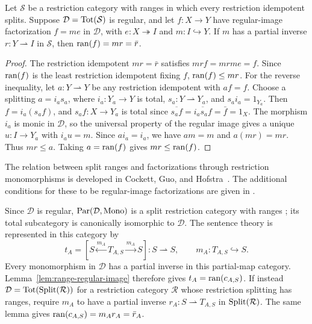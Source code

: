 \begin{lemma}\label{lem:range-regular-image}
Let $\mathcal S$ be a restriction category with ranges in which every
restriction idempotent splits. Suppose $\mathcal D=\operatorname{Tot}(\mathcal S)$
is regular, and let $f:X\to Y$ have regular-image factorization
$f=me$ in $\mathcal D$, with $e:X\twoheadrightarrow I$ and
$m:I\hookrightarrow Y$.
If $m$ has a partial inverse $r:Y\rightharpoonup I$ in $\mathcal S$,
then $\operatorname{ran}(f)=mr=\bar r$.
\end{lemma}
\begin{proof}
The restriction idempotent $mr=\bar r$ satisfies $mrf=mrme=f$.
Since $\operatorname{ran}(f)$ is the least restriction idempotent fixing $f$,
$\operatorname{ran}(f)\leq mr$. For the reverse inequality, let $a:Y\rightharpoonup Y$
be any restriction idempotent with $af=f$. Choose a splitting
$a=i_a s_a$, where $i_a:Y_a\to Y$ is total, $s_a:Y\rightharpoonup Y_a$,
and $s_a i_a=1_{Y_a}$. Then $f=i_a(s_a f)$, and $s_a f:X\to Y_a$ is
total since $\overline{s_a f}=\overline{i_a s_a f}=\bar f=1_X$.
The morphism $i_a$ is monic in $\mathcal D$, so the universal property
of the regular image gives a unique $u:I\to Y_a$ with $i_a u=m$.
Since $a i_a=i_a$, we have $am=m$ and $a(mr)=mr$. Thus $mr\leq a$.
Taking $a=\operatorname{ran}(f)$ gives $mr\leq\operatorname{ran}(f)$.
\end{proof}

The relation between split ranges and factorizations through restriction
monomorphisms is developed in Cockett, Guo, and
Hofstra~\cite[Theorem 4.7]{CGHRangeI}.
The additional conditions for these to be regular-image factorizations
are given in \cite[Section 3.16 and Proposition 3.17]{CGHRangeII}.

Since $\mathcal D$ is regular, $\operatorname{Par}(\mathcal D,\operatorname{Mono})$ is a
split restriction category with ranges
\cite[Theorem 4.5 and Section 4.11]{CGHRangeI}; its total subcategory
is canonically isomorphic to $\mathcal D$.
The sentence theory is represented in this category by
\[
 t_A=[S\xleftarrow{m_A}T_{A,S}\xrightarrow{m_A}S]:S\rightharpoonup S,
 \qquad m_A:T_{A,S}\hookrightarrow S.
\]
Every monomorphism in $\mathcal D$ has a partial inverse in this
partial-map category. Lemma~\ref{lem:range-regular-image} therefore
gives $t_A=\operatorname{ran}(c_{A,S})$.
If instead $\mathcal D=\operatorname{Tot}(\operatorname{Split}(\mathcal R))$ for a restriction
category $\mathcal R$ whose restriction splitting has ranges, require
$m_A$ to have a partial inverse
$r_A:S\rightharpoonup T_{A,S}$ in $\operatorname{Split}(\mathcal R)$.
The same lemma gives $\operatorname{ran}(c_{A,S})=m_A r_A=\bar r_A$.

